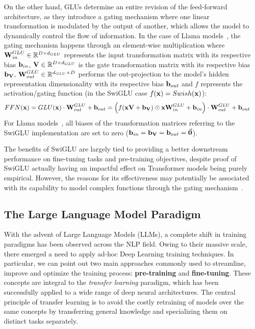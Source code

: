On the other hand, GLUs determine an entire revision of the feed-forward architecture, as they introduce a gating mechanism where one linear transformation is modulated by the output of another, which allows the model to dynamically control the flow of information.
In the case of Llama models~\cite{touvron2023,dubey2024}, the gating mechanism happens through an element-wise multiplication where $\bm{\mathbf{W}}_{in}^{GLU} \in \mathbb{R}^{D \times d_{GLU}}$ represents the input transformation matrix with its respective bias $\bm{\mathbf{b}}_{in}$, $\bm{\mathbf{V}} \in \mathbb{R}^{D \times d_{GLU}}$ is the gate transformation matrix with its respective bias $\bm{\mathbf{b_{V}}}$, $\bm{\mathbf{W}}_{out}^{GLU} \in \mathbb{R}^{d_{GLU} \times D}$ performs the out-projection to the model's hidden representation dimensionality with its respective bias $\bm{\mathbf{b}}_{out}$ and $f$ represents the activation/gating function (in the SwiGLU case $f(\bm{\mathbf{x}}) = Swish(\bm{\mathbf{x}})$):
\begin{equation}
    \label{eq:background_ffnn}
    FFN(\bm{\mathbf{x}}) = GLU(\bm{\mathbf{x}}) \cdot \bm{\mathbf{W}}_{out}^{GLU} + \bm{\mathbf{b}}_{out} 
    = \Bigl( f(\bm{\mathbf{x}}\bm{\mathbf{V}} + \bm{\mathbf{b_V}}) \odot \bm{\mathbf{x}}\bm{\mathbf{W}}_{in}^{GLU} + \bm{\mathbf{b}}_{in} \Bigr) \cdot \bm{\mathbf{W}}_{out}^{GLU} + \bm{\mathbf{b}}_{out}
\end{equation}
For Llama models~\cite{touvron2023,dubey2024}, all biases of the transformation matrices referring to the SwiGLU implementation are set to zero ($\bm{\mathbf{b}}_{in} = \bm{\mathbf{b_V}} = \bm{\mathbf{b}}_{out} = \vec {\bm{\mathbf{0}}}$).

The benefits of SwiGLU are largely tied to providing a better downstream performance on fine-tuning tasks and pre-training objectives, despite proof of SwiGLU actually having an impactful effect on Transformer models being purely empirical.
However, the reasons for its effectiveness may potentially be associated with its capability to model complex functions through the gating mechanism~\cite{shazeer2020,shibuya2023}.

\subsection{The Large Language Model Paradigm}

With the advent of Large Language Models (LLMs), a complete shift in training paradigms has been observed across the NLP field.
Owing to their massive scale, there emerged a need to apply ad-hoc Deep Learning training techniques.
In particular, we can point out two main approaches commonly used to streamline, improve and optimize the training process: \textbf{pre-training} and \textbf{fine-tuning}.
These concepts are integral to the \emph{transfer learning} paradigm, which has been successfully applied to a wide range of deep neural architectures.
The central principle of transfer learning is to avoid the costly retraining of models over the same concepts by transferring general knowledge and specializing them on distinct tasks separately. 

